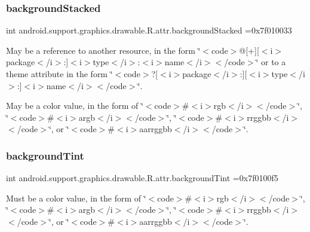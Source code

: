 \subsubsection{\texorpdfstring{background\+Stacked}{backgroundStacked}}
{\footnotesize\ttfamily int android.\+support.\+graphics.\+drawable.\+R.\+attr.\+background\+Stacked =0x7f010033\hspace{0.3cm}{\ttfamily [static]}}

May be a reference to another resource, in the form \char`\"{}$<$code$>$@\mbox{[}+\mbox{]}\mbox{[}$<$i$>$package$<$/i$>$\+:\mbox{]}$<$i$>$type$<$/i$>$\+:$<$i$>$name$<$/i$>$$<$/code$>$\char`\"{} or to a theme attribute in the form \char`\"{}$<$code$>$?\mbox{[}$<$i$>$package$<$/i$>$\+:\mbox{]}\mbox{[}$<$i$>$type$<$/i$>$\+:\mbox{]}$<$i$>$name$<$/i$>$$<$/code$>$\char`\"{}. 

May be a color value, in the form of \char`\"{}$<$code$>$\#$<$i$>$rgb$<$/i$>$$<$/code$>$\char`\"{}, \char`\"{}$<$code$>$\#$<$i$>$argb$<$/i$>$$<$/code$>$\char`\"{}, \char`\"{}$<$code$>$\#$<$i$>$rrggbb$<$/i$>$$<$/code$>$\char`\"{}, or \char`\"{}$<$code$>$\#$<$i$>$aarrggbb$<$/i$>$$<$/code$>$\char`\"{}. \mbox{\label{classandroid_1_1support_1_1graphics_1_1drawable_1_1R_1_1attr_a7fe684b3b245dd48c76020beacab95ad}} 
\subsubsection{\texorpdfstring{background\+Tint}{backgroundTint}}
{\footnotesize\ttfamily int android.\+support.\+graphics.\+drawable.\+R.\+attr.\+background\+Tint =0x7f0100f5\hspace{0.3cm}{\ttfamily [static]}}

Must be a color value, in the form of \char`\"{}$<$code$>$\#$<$i$>$rgb$<$/i$>$$<$/code$>$\char`\"{}, \char`\"{}$<$code$>$\#$<$i$>$argb$<$/i$>$$<$/code$>$\char`\"{}, \char`\"{}$<$code$>$\#$<$i$>$rrggbb$<$/i$>$$<$/code$>$\char`\"{}, or \char`\"{}$<$code$>$\#$<$i$>$aarrggbb$<$/i$>$$<$/code$>$\char`\"{}. 

